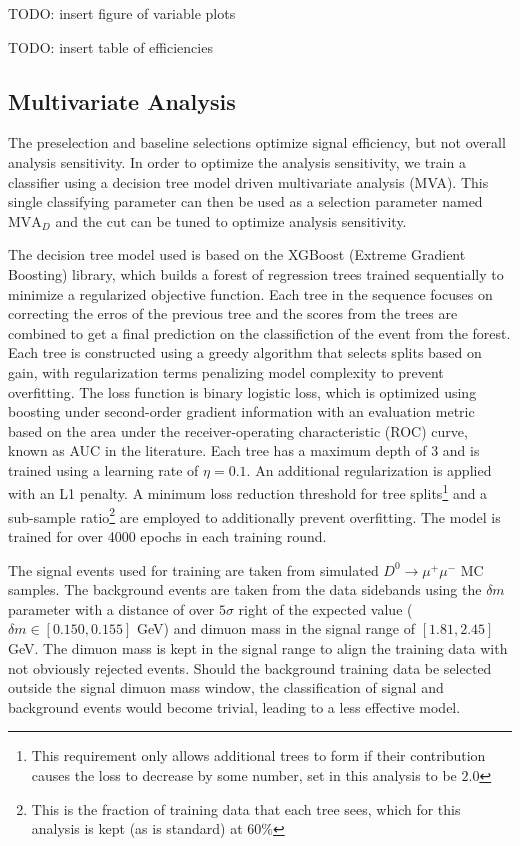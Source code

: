 TODO: insert figure of variable plots

TODO: insert table of efficiencies


\subsection{Multivariate Analysis}

The preselection and baseline selections optimize signal efficiency, but not overall analysis sensitivity. In order to optimize the analysis sensitivity, we train a classifier using a decision tree model driven multivariate analysis (MVA). This single classifying parameter can then be used as a selection parameter named $\text{MVA}_D$ and the cut can be tuned to optimize analysis sensitivity.

The decision tree model used is based on the XGBoost (Extreme Gradient Boosting) library, which builds a forest of regression trees trained sequentially to minimize a regularized objective function. Each tree in the sequence focuses on correcting the erros of the previous tree and the scores from the trees are combined to get a final prediction on the classifiction of the event from the forest. Each tree is constructed using a greedy algorithm that selects splits based on gain, with regularization terms penalizing model complexity to prevent overfitting. The loss function is binary logistic loss, which is optimized using boosting under second-order gradient information with an evaluation metric based on the area under the receiver-operating characteristic (ROC) curve, known as AUC in the literature. Each tree has a maximum depth of 3 and is trained using a learning rate of $\eta = 0.1$. An additional regularization is applied with an L1 penalty. A minimum loss reduction threshold for tree splits\footnote{This requirement only allows additional trees to form if their contribution causes the loss to decrease by some number, set in this analysis to be $2.0$} and a sub-sample ratio\footnote{This is the fraction of training data that each tree sees, which for this analysis is kept (as is standard) at $60\%$} are employed to additionally prevent overfitting. The model is trained for over 4000 epochs in each training round.

The signal events used for training are taken from simulated $D^0 \to \mu^+ \mu^-$ MC samples. The background events are taken from the data sidebands using the $\delta m$ parameter with a distance of over $5\sigma$ right of the expected value ($\delta m \in [0.150, 0.155]$ GeV) and dimuon mass in the signal range of $[1.81, 2.45]$ GeV. The dimuon mass is kept in the signal range to align the training data with not obviously rejected events. Should the background training data be selected outside the signal dimuon mass window, the classification of signal and background events would become trivial, leading to a less effective model.

